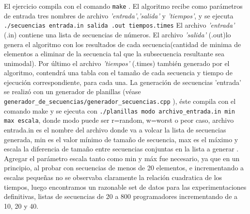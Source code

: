 El ejercicio compila con el comando \texttt{make} .
\newline
El algoritmo recibe como parámetros de entrada tres nombres de archivo \emph{'entrada'},\emph{'salida'} y \emph{'tiempos'}, y se ejecuta \texttt{./secuencias entrada.in salida .out tiempos.times}
\newline
El archivo \emph{'entrada'} (.in) contiene una lista de secuencias de números.
\newline
El archivo \emph{'salida'} (.out)lo genera el algoritmo con los resultados de cada secuencia(cantidad de minima de elementos a eliminar de la secuencia tal que la subsecuencia resultante sea unimodal).
\newline
Por último el archivo \emph{'tiempos'} (.times)  también generado por el algoritmo, contendrá una tabla con el tamaño de cada secuencia y tiempo de ejecución correspondiente, para cada una.
\newline
La generación de secuencias 'entrada' se realizó con un generador de planillas (véase \texttt{generador\_de\_secuencias/generador\_secuencias.cpp} ), éste compila con el comando make y se ejecuta con 
\texttt{./planillas modo archivo\_entrada.in  min max escala}, donde modo puede ser r=random, w=worst o peor caso, archivo entrada.in es el nombre del archivo donde va a volcar la lista de secuencias generada, min es el valor mínimo de tamaño de secuencia, max es el máximo y escala la diferencia de tamaño entre secuencias conjuntas en la lista a generar .
\newline
Agregar el parámetro escala tanto como min y máx fue necesario, ya que en un principio, al probar con secuencias de menos de 20 elementos, e incrementando a escalas pequeñas no se observaba claramente la relación cuadratica de los tiempos, luego encontramos un razonable set de datos para las experimentaciones definitivas, listas de secuencias de 20 a 800 programadores incrementando de a 10, 20 y 40.  
